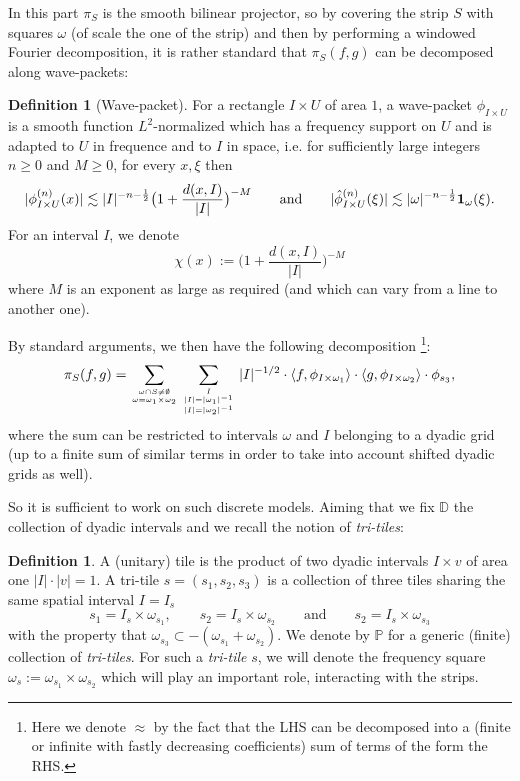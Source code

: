 \documentclass[a4paper,11pt,oneside]{amsart}
\newcommand{\PP}{\mathbb{P}}
\theoremstyle{plain}
\theoremstyle{definition}
\newtheorem{definition}[theorem]{Definition}
\begin{document}
In this part $\pi_{S}$ is the smooth bilinear projector, so by covering the strip $S$ with squares $\omega$ (of scale the one of the strip) and then by performing a windowed Fourier decomposition, it is rather standard that $\pi_S(f,g)$ can be decomposed along wave-packets:

\begin{definition}[Wave-packet] For a rectangle $I \times U$ of area $1$, a wave-packet $\phi_{I\times U}$ is a smooth function $L^2$-normalized which has a frequency support on $U$ and is adapted to $U$ in frequence and to $I$ in space, i.e. for sufficiently large integers $n\geq 0$ and $M\geq 0$, for every $x,\xi$ then
$$ |\phi_{I\times U}^{(n)}(x)|\lesssim |I|^{-n-\frac{1}{2}} \big(1+\frac{d(x,I)}{|I|}\big)^{-M} \qquad \textrm{and} \qquad |\hat \phi_{I\times U}^{(n)}(\xi)|\lesssim |\omega|^{-n-\frac{1}{2}} {\bf 1}_{\omega}(\xi).$$
For an interval $I$, we denote
$$ \chi(x):=\big(1+\frac{d(x,I)}{|I|}\big)^{-M}$$
where $M$ is an exponent as large as required (and which can vary from a line to another one).

\end{definition}

By standard arguments, we then have the following decomposition \footnote{Here we denote $\approx$ by the fact that the LHS can be decomposed into a (finite or infinite with fastly decreasing coefficients) sum of terms of the form the RHS.}:
$$ \pi_S(f,g)= \sum_{\omega \cap S \neq \emptyset \atop \omega=\omega_1 \times \omega_2} 
 \sum_{I \atop {|I|=|\omega_1|^{-1} \atop |I|=|\omega_2|^{-1}}} |I|^{-1/2} \cdot \langle f, \phi_{I\times \omega_1}\rangle \cdot \langle g,\phi_{I \times \omega_2}\rangle \cdot \phi_{s_3},$$ 
where the sum can be restricted to intervals $\omega$ and $I$ belonging to a dyadic grid (up to a finite sum of similar terms in order to take into account shifted dyadic grids as well).

So it is sufficient to work on such discrete models. Aiming that we fix ${\mathbb D}$ the collection of dyadic intervals and we recall the notion of {\it tri-tiles}:

\begin{definition} A (unitary) tile is the product of two dyadic intervals $I\times v$ of area one $|I| \cdot |v|=1$. A tri-tile $s=(s_1,s_2,s_3)$ is a collection of three tiles sharing the same spatial interval $I=I_s$
$$ s_1=I_s \times \omega_{s_1}, \qquad s_2=I_s \times \omega_{s_2} \qquad \textrm{and} \qquad s_2=I_s \times \omega_{s_3}$$
with the property that $\omega_{s_3} \subset -(\omega_{s_1}+\omega_{s_2})$. We denote by $\PP$ for a generic (finite) collection of {\it tri-tiles}.
For such a {\it tri-tile} $s$, we will denote the frequency square $\omega_{s}:=\omega_{s_1} \times \omega_{s_2}$ which will play an important role, interacting with the strips.
\end{definition}
\end{document}
